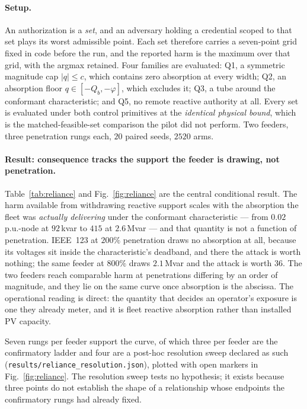 \paragraph{Setup.} An authorization is a \emph{set}, and an adversary holding a credential scoped
to that set plays its worst admissible point. Each set therefore carries a seven-point grid fixed
in code before the run, and the reported harm is the maximum over that grid, with the argmax
retained. Four families are evaluated: Q1, a symmetric magnitude cap $|q| \le c$, which contains
zero absorption at every width; Q2, an absorption floor $q \in [-Q_b, -\varphi]$, which excludes
it; Q3, a tube around the conformant characteristic; and Q5, no remote reactive authority at all.
Every set is evaluated under both control primitives at the \emph{identical physical bound}, which
is the matched-feasible-set comparison the pilot did not perform. Two feeders, three penetration
rungs each, $20$ paired seeds, $2520$ arms.

\paragraph{Result: consequence tracks the support the feeder is drawing, not penetration.}
Table~\ref{tab:reliance} and Fig.~\ref{fig:reliance} are the central conditional result. The harm
available from withdrawing reactive support scales with the absorption the fleet was
\emph{actually delivering} under the conformant characteristic --- from $0.02$ p.u.-node at
$92$\,kvar to $415$ at $2.6$\,Mvar --- and that quantity is not a function of penetration.
IEEE~123 at $200\%$ penetration draws no absorption at all, because its voltages sit inside the
characteristic's deadband, and there the attack is worth nothing; the same feeder at $800\%$ draws
$2.1$\,Mvar and the attack is worth $36$. The two feeders reach comparable harm at penetrations
differing by an order of magnitude, and they lie on the same curve once absorption is the abscissa.
The operational reading is direct: the quantity that decides an operator's exposure is one they
already meter, and it is fleet reactive absorption rather than installed PV capacity.

Seven rungs per feeder support the curve, of which three per feeder are the confirmatory ladder and
four are a post-hoc resolution sweep declared as such
(\texttt{results/reliance\_resolution.json}), plotted with open markers in
Fig.~\ref{fig:reliance}. The resolution sweep tests no hypothesis; it exists because three points
do not establish the shape of a relationship whose endpoints the confirmatory rungs had already
fixed.


